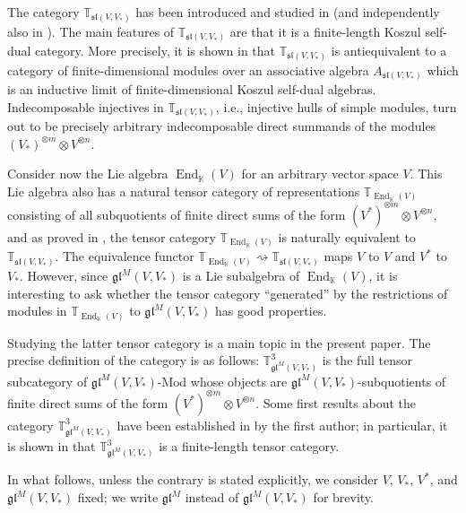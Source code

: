 \documentclass[11pt]{article}
\theoremstyle{plain}
\theoremstyle{nonumberplain}
\theoremstyle{plain}
\theoremstyle{nonumberplain}
\newcommand\bK{{\mathbb K}}
\newcommand\bT{{\mathbb T}}
\newcommand\fgl{\mathfrak{gl}}
\newcommand\fsl{\mathfrak{sl}}
\DeclareMathOperator{\End}{\mathrm{End}}
\begin{document}
The category $\bT_{\fsl\left(V,V_*\right)}$ has been introduced and studied in \cite{DPS} (and independently also in \cite{SS}).  The main features of $\bT_{\fsl\left(V,V_*\right)}$ are that it is a finite-length Koszul self-dual category.  More precisely, it is shown in \cite{DPS} that $\bT_{\fsl\left(V,V_*\right)}$ is antiequivalent to a category of finite-dimensional modules over an associative algebra $A_{\fsl\left(V,V_*\right)}$ which is an inductive limit of finite-dimensional Koszul self-dual algebras.  Indecomposable injectives in $\bT_{\fsl\left(V,V_*\right)}$, i.e., injective hulls of simple modules, turn out to be precisely arbitrary indecomposable direct summands of the modules $\left( V_*\right)^{\otimes m}\otimes V^{\otimes n}$.%

Consider now the Lie algebra $\End_\bK(V)$ for an arbitrary vector space $V$.  This Lie algebra also has a natural tensor category of representations $\bT_{\End_\bK(V)}$ consisting of all subquotients of finite direct sums of the form $\left(V^*\right)^{\otimes m}\otimes V^{\otimes n} $, and as proved in {\cite{PS2}}, the tensor category $\bT_{\End_\bK(V)}$ is naturally equivalent to $\bT_{\fsl\left(V,V_*\right)}$.  The equivalence functor $\bT_{\End_\bK(V)}\rightsquigarrow \bT_{\fsl\left(V,V_*\right)}$ maps $V$ to $V$ and $V^*$ to $V_*$.  However, since $\fgl^M\left(V,V_*\right)$ is a Lie subalgebra of $\End_\bK(V)$, it is interesting to ask whether the tensor category ``generated'' by the restrictions of modules in $\bT_{\End_\bK(V)}$ to $\fgl^M\left(V,V_*\right)$ has good properties.

Studying the latter tensor category is a main topic in the present paper.  The precise definition of the category is as follows: $\bT^3_{\fgl^M\left(V,V_*\right)}$ is the full tensor subcategory of $\fgl^M\left(V,V_*\right)\text{-}\mathrm{Mod}$ whose objects are $\fgl^M\left(V,V_*\right)$-subquotients of finite direct sums of the form $\left(V^*\right)^{\otimes m}\otimes V^{\otimes n}$.  Some first results about the category $\bT^3_{\fgl^M\left(V,V_*\right)}$ have been established in {\cite{Chi14}} by the first author; in particular, it is shown in {\cite{Chi14}} that $\bT^3_{\fgl^M\left(V,V_*\right)}$ is a finite-length tensor category.

In what follows, unless the contrary is stated explicitly, we consider $V$, $V_*$, $V^*$, and $\fgl^M\left(V,V_*\right)$ fixed; we write $\fgl^M$ instead of $\fgl^M\left(V,V_*\right)$ for brevity.
\end{document}
